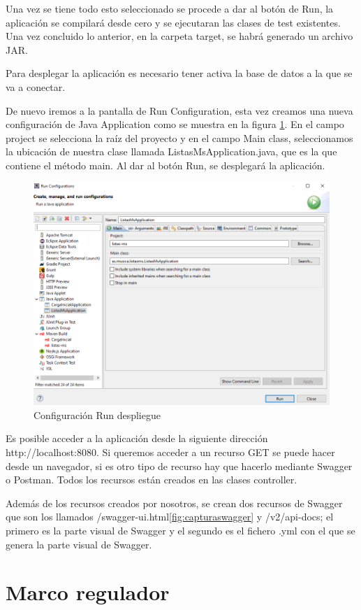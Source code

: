 \documentclass[12pt]{report} %
\begin{document}
Una vez se tiene todo esto seleccionado se procede a dar al botón de Run, la aplicación se compilará desde cero y se ejecutaran las clases de test existentes. Una vez concluido lo anterior, en la carpeta target, se habrá generado un archivo JAR.

Para desplegar la aplicación es necesario tener activa la base de datos a la que se va a conectar.

De nuevo iremos a la pantalla de Run Configuration, esta vez creamos una nueva configuración de Java Application como se muestra en la figura \ref{fig:configuraciondespliegue}. En el campo project se selecciona la raíz del proyecto y en el campo Main class, seleccionamos la ubicación de nuestra clase llamada ListasMsApplication.java, que es la que contiene el método main. Al dar al botón Run, se desplegará la aplicación. 

\begin{figure}
	\centering
	\includegraphics[width=0.7\linewidth]{imagenes/configuracionDespliegue}
	\caption{Configuración Run despliegue}
	\label{fig:configuraciondespliegue}
\end{figure}

Es posible acceder a la aplicación desde la siguiente dirección http://localhost:8080. Si queremos acceder a un recurso GET se puede hacer desde un navegador, si es otro tipo de recurso hay que hacerlo mediante Swagger o Postman. Todos los recursos están creados en las clases controller.

Además de los recursos creados por nosotros, se crean dos recursos de Swagger que son los llamados /swagger-ui.html\ref{fig:capturaswagger} y /v2/api-docs; el primero es la parte visual de Swagger y el segundo es el fichero .yml con el que se genera la parte visual de Swagger.

\chapter{Marco regulador}
\end{document}
